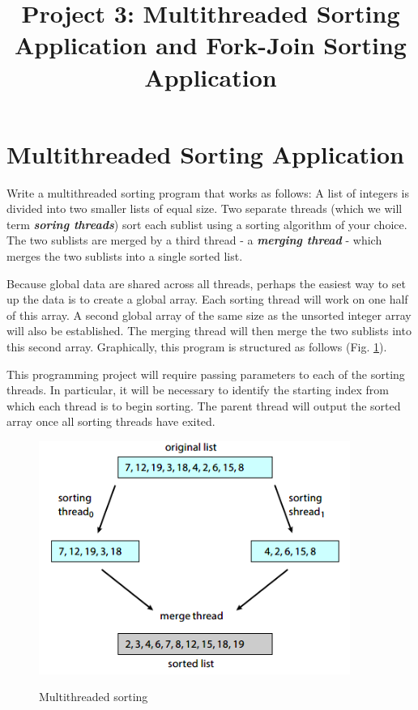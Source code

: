 \documentclass[UTF8,10pt,a4paper]{article}
\title{Project 3: Multithreaded Sorting Application and Fork-Join Sorting Application}
\date{}
\theoremstyle{Problem}
\theoremstyle{Solution}
\begin{document}
\maketitle
\thispagestyle{FirstPageStyle}

\section{Multithreaded Sorting Application}
Write a multithreaded sorting program that works as follows: A list of integers is divided into two smaller lists of equal size. Two separate threads (which we will term \textbf{\textit{soring threads}}) sort each sublist using a sorting algorithm of your choice. The two sublists are merged by a third thread - a \textbf{\textit{merging thread}} - which merges the two sublists into a single sorted list.

Because global data are shared across all threads, perhaps the easiest way to set up the data is to create a global array. Each sorting thread will work on one half of this array. A second global array of the same size as the unsorted integer array will also be established. The merging thread will then merge the two sublists into this second array. Graphically, this program is structured as follows (Fig. \ref{fig1}).

This programming project will require passing parameters to each of the
sorting threads. In particular, it will be necessary to identify the starting index from which each thread is to begin sorting. The parent thread will output the sorted array once all sorting threads have exited.

\begin{figure}[H]
  \centering
  \includegraphics[width=4in]{fig1.png}\\
  \caption{Multithreaded sorting}\label{fig1}
\end{figure}
\end{document}
